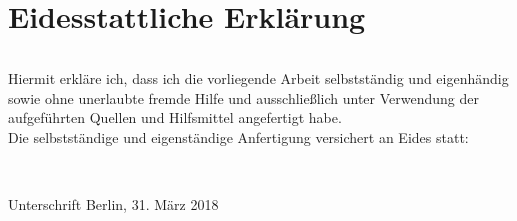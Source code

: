 \thispagestyle{empty}
\section*{Eidesstattliche Erklärung}
\begin{verbatim}

\end{verbatim}
Hiermit erkl\"{a}re ich, %
dass ich die vorliegende Arbeit %
selbstst\"{a}ndig und eigenh\"{a}ndig sowie ohne unerlaubte fremde Hilfe und ausschließlich unter Verwendung der aufgef\"{u}hrten Quellen und Hilfsmittel angefertigt habe. \\

Die selbstständige und eigenständige Anfertigung versichert an Eides statt:

\begin{verbatim}

\end{verbatim}
\hrulefill\\
\hspace*{2cm}Unterschrift
\hfill
Berlin, 31. März 2018
